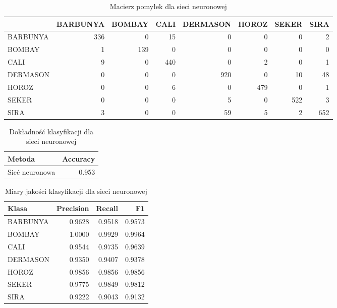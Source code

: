 \begin{table}[H]

\caption{\label{tab:conf-matrix-nn}Macierz pomyłek dla sieci neuronowej}
\centering
\begin{tabular}[t]{lrrrrrrr}
\toprule
  & BARBUNYA & BOMBAY & CALI & DERMASON & HOROZ & SEKER & SIRA\\
\midrule
BARBUNYA & 336 & 0 & 15 & 0 & 0 & 0 & 2\\
BOMBAY & 1 & 139 & 0 & 0 & 0 & 0 & 0\\
CALI & 9 & 0 & 440 & 0 & 2 & 0 & 1\\
DERMASON & 0 & 0 & 0 & 920 & 0 & 10 & 48\\
HOROZ & 0 & 0 & 6 & 0 & 479 & 0 & 1\\
\addlinespace
SEKER & 0 & 0 & 0 & 5 & 0 & 522 & 3\\
SIRA & 3 & 0 & 0 & 59 & 5 & 2 & 652\\
\bottomrule
\end{tabular}
\end{table}

\begin{table}[H]

\caption{\label{tab:accuracy-nn}Dokładność klasyfikacji dla sieci neuronowej}
\centering
\begin{tabular}[t]{lr}
\toprule
Metoda & Accuracy\\
\midrule
Sieć neuronowa & 0.953\\
\bottomrule
\end{tabular}
\end{table}

\begin{table}[H]

\caption{\label{tab:metrics-nn}Miary jakości klasyfikacji dla sieci neuronowej}
\centering
\begin{tabular}[t]{lrrr}
\toprule
Klasa & Precision & Recall & F1\\
\midrule
BARBUNYA & 0.9628 & 0.9518 & 0.9573\\
BOMBAY & 1.0000 & 0.9929 & 0.9964\\
CALI & 0.9544 & 0.9735 & 0.9639\\
DERMASON & 0.9350 & 0.9407 & 0.9378\\
HOROZ & 0.9856 & 0.9856 & 0.9856\\
\addlinespace
SEKER & 0.9775 & 0.9849 & 0.9812\\
SIRA & 0.9222 & 0.9043 & 0.9132\\
\bottomrule
\end{tabular}
\end{table}

